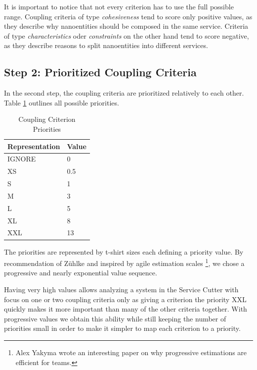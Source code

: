 It is important to notice that not every criterion has to use the full possible range. Coupling criteria of type \textit{cohesiveness} tend to score only positive values, as they describe why nanoentities should be composed in the same service. Criteria of type \textit{characteristics} oder \textit{constraints} on the other hand tend to score negative, as they describe reasons to split nanoentities into different services.

\subsection{Step 2: Prioritized Coupling Criteria}

In the second step, the coupling criteria are prioritized relatively to each other. Table \ref{tab:priorities} outlines all possible priorities.

\begin{table}[H]
	\centering
	\caption{Coupling Criterion Priorities}
	\label{tab:priorities}
	\begin{tabular}{|p{70pt}|p{30pt}|}
		\hline	
		Representation & Value  \\
		\hline
		IGNORE & 0  \\
		\hline
		XS & 0.5  \\
		\hline
		S & 1  \\
		\hline
		M & 3  \\
		\hline
		L & 5  \\
		\hline
		XL & 8  \\
		\hline
		XXL & 13  \\
		\hline
	\end{tabular}
\end{table}

The priorities are represented by t-shirt sizes each defining a priority value. By recommendation of Zühlke and inspired by agile estimation scales \footnote{Alex Yakyma wrote an interesting paper on why progressive estimations are efficient for teams\cite{estimation}.}, we chose a progressive and nearly exponential value sequence. 

Having very high values allows analyzing a system in the Service Cutter with focus on one or two coupling criteria only as giving a criterion the priority XXL quickly makes it more important than many of the other criteria together. With progressive values we obtain this ability while still keeping the number of priorities small in order to make it simpler to map each criterion to a priority. 

